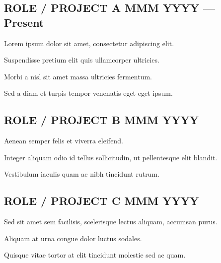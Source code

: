 \documentclass[letter,10pt]{article}
\begin{document}
\subsection{{ROLE / PROJECT A \hfill MMM YYYY --- Present}}
\begin{zitemize}
\item Lorem ipsum dolor sit amet, consectetur adipiscing elit.
\item Suspendisse pretium elit quis ullamcorper ultricies.
\item Morbi a nisl sit amet massa ultricies fermentum.
\item Sed a diam et turpis tempor venenatis eget eget ipsum.
\end{zitemize}

\subsection{{ROLE / PROJECT B \hfill MMM YYYY}}
\begin{zitemize}
\item Aenean semper felis et viverra eleifend.
\item Integer aliquam odio id tellus sollicitudin, ut pellentesque elit blandit.
\item Vestibulum iaculis quam ac nibh tincidunt rutrum.
\end{zitemize}

\subsection{{ROLE / PROJECT C \hfill MMM YYYY}}
\begin{zitemize}
\item Sed sit amet sem facilisis, scelerisque lectus aliquam, accumsan purus.
\item Aliquam at urna congue dolor luctus sodales.
\item Quisque vitae tortor at elit tincidunt molestie sed ac quam.
\end{zitemize}
\end{document}
